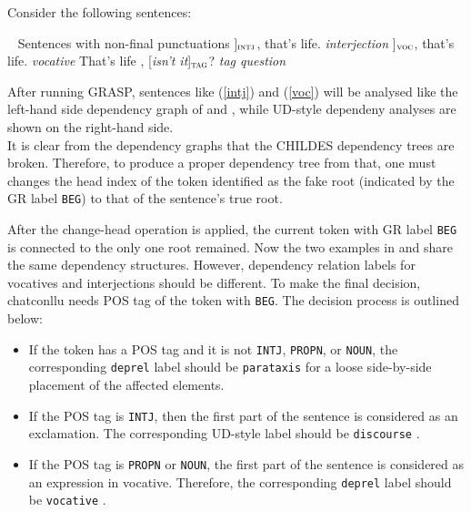 Consider the following sentences:

\pex~ Sentences with non-final punctuations\label{roots}
\a {[\sl Well\/}]$_{\text{\sc intj}}$, that's life.        \hfill {\sl interjection}\label{intj}
\a {[\sl  Son\/}]$_{\text{\sc voc}}$, that's life.         \hfill {\sl vocative}\label{voc}
\a That's life , {[\sl isn't it}]$_{\text{\sc tag}}$?    \hfill {\sl tag question}\label{tagq}
\xe


After running GRASP, sentences like (\ref{intj}) and (\ref{voc}) will be analysed like the left-hand side dependency graph of  and , while UD-style dependeny analyses are shown on the right-hand side.\\


It is clear from the dependency graphs that the CHILDES dependency trees are broken. Therefore, to produce a proper dependency tree from that, one must changes the head index of the token identified as the fake root (indicated by the GR label \texttt{BEG}) to that of the sentence's true root.

After the change-head operation is applied, the current token with GR label \texttt{BEG} is connected to the only one root remained. Now the two examples in  and  share the same dependency structures. However, dependency relation labels for vocatives and interjections should be different. To make the final decision, chatconllu needs POS tag of the token with \texttt{BEG}. The decision process is outlined below:\\

\begin{itemize}
    \item If the token has a POS tag and it is not \texttt{INTJ}, \texttt{PROPN}, or \texttt{NOUN}, the corresponding \texttt{deprel}  label should be \texttt{parataxis} for a loose side-by-side placement of the affected elements.
    \item If the POS tag is \texttt{INTJ}, then the first part of the sentence is considered as an exclamation. The corresponding UD-style label should be \texttt{discourse} .
    \item If the POS tag is \texttt{PROPN} or \texttt{NOUN}, the first part of the sentence is considered as an expression in vocative. Therefore, the corresponding \texttt{deprel} label should be \texttt{vocative} .
\end{itemize}

